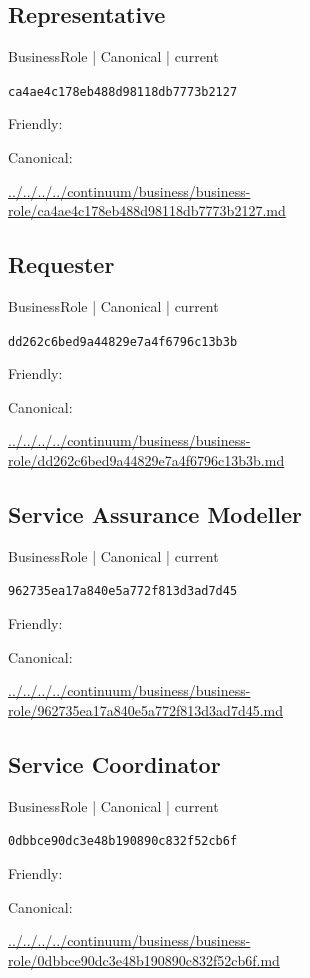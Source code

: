 \documentclass[10pt,a4paper]{article}
\begin{document}
\subsection*{Representative}
{\small BusinessRole | Canonical | current}\par
\texttt{ca4ae4c178eb488d98118db7773b2127}\par
Friendly: \par
Canonical: \par
{\footnotesize\url{../../../../continuum/business/business-role/ca4ae4c178eb488d98118db7773b2127.md}}\par
\subsection*{Requester}
{\small BusinessRole | Canonical | current}\par
\texttt{dd262c6bed9a44829e7a4f6796c13b3b}\par
Friendly: \par
Canonical: \par
{\footnotesize\url{../../../../continuum/business/business-role/dd262c6bed9a44829e7a4f6796c13b3b.md}}\par
\subsection*{Service Assurance Modeller}
{\small BusinessRole | Canonical | current}\par
\texttt{962735ea17a840e5a772f813d3ad7d45}\par
Friendly: \par
Canonical: \par
{\footnotesize\url{../../../../continuum/business/business-role/962735ea17a840e5a772f813d3ad7d45.md}}\par
\subsection*{Service Coordinator}
{\small BusinessRole | Canonical | current}\par
\texttt{0dbbce90dc3e48b190890c832f52cb6f}\par
Friendly: \par
Canonical: \par
{\footnotesize\url{../../../../continuum/business/business-role/0dbbce90dc3e48b190890c832f52cb6f.md}}\par
\end{document}
